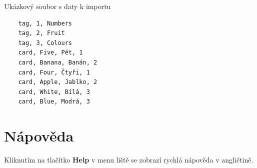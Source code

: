 \documentclass[11pt]{article}
\begin{document}
Ukázkový soubor s daty k importu

\begin{verbatim}
    tag, 1, Numbers
    tag, 2, Fruit
    tag, 3, Colours
    card, Five, Pět, 1
    card, Banana, Banán, 2
    card, Four, Čtyři, 1
    card, Apple, Jablko, 2
    card, White, Bílá, 3
    card, Blue, Modrá, 3
\end{verbatim}

\hypertarget{nuxe1povux11bda}{%
\section{Nápověda}\label{nuxe1povux11bda}}

Kliknutím na tlačítko \textbf{Help} v menu liště se zobrazí rychlá
nápověda v angličtině.
\clearpage

\end{document}
